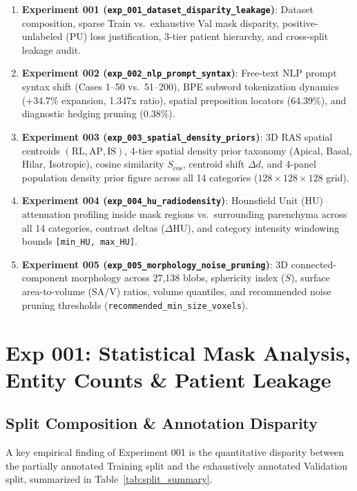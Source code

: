 \documentclass[11pt,a4paper]{article}
\begin{document}
\begin{enumerate}
    \item \textbf{Experiment 001 (\texttt{exp\_001\_dataset\_disparity\_leakage})}: Dataset composition, sparse Train vs.\ exhaustive Val mask disparity, positive-unlabeled (PU) loss justification, 3-tier patient hierarchy, and cross-split leakage audit.
    \item \textbf{Experiment 002 (\texttt{exp\_002\_nlp\_prompt\_syntax})}: Free-text NLP prompt syntax shift (Cases 1--50 vs.\ 51--200), BPE subword tokenization dynamics (+34.7\% expansion, 1.347x ratio), spatial preposition locators (64.39\%), and diagnostic hedging pruning (0.38\%).
    \item \textbf{Experiment 003 (\texttt{exp\_003\_spatial\_density\_priors})}: 3D RAS spatial centroids $(\text{RL}, \text{AP}, \text{IS})$, 4-tier spatial density prior taxonomy (Apical, Basal, Hilar, Isotropic), cosine similarity $S_{\text{cos}}$, centroid shift $\Delta d$, and 4-panel population density prior figure across all 14 categories ($128 \times 128 \times 128$ grid).
    \item \textbf{Experiment 004 (\texttt{exp\_004\_hu\_radiodensity})}: Hounsfield Unit (HU) attenuation profiling inside mask regions vs.\ surrounding parenchyma across all 14 categories, contrast deltas ($\Delta \text{HU}$), and category intensity windowing bounds \texttt{[min\_HU, max\_HU]}.
    \item \textbf{Experiment 005 (\texttt{exp\_005\_morphology\_noise\_pruning})}: 3D connected-component morphology across 27,138 blobs, sphericity index ($S$), surface area-to-volume ($\text{SA}/\text{V}$) ratios, volume quantiles, and recommended noise pruning thresholds (\texttt{recommended\_min\_size\_voxels}).
\end{enumerate}

\section{Exp 001: Statistical Mask Analysis, Entity Counts \& Patient Leakage}

\subsection{Split Composition \& Annotation Disparity}
A key empirical finding of Experiment 001 is the quantitative disparity between the partially annotated Training split and the exhaustively annotated Validation split, summarized in Table~\ref{tab:split_summary}.
\end{document}
